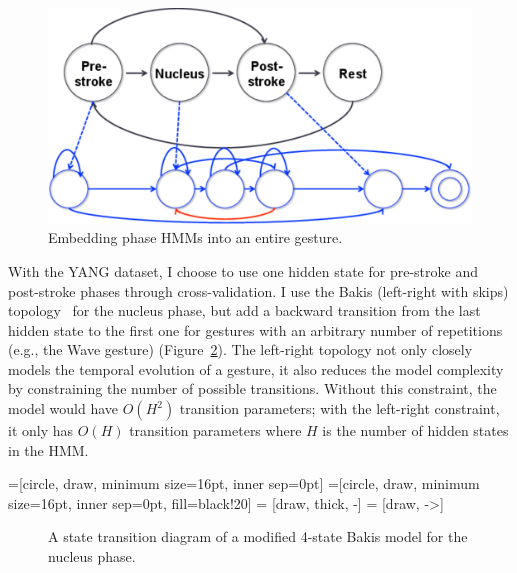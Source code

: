 \begin{figure}[tbh]
\centering
\includegraphics[width=0.7\columnwidth]{figures/embedded.pdf}
\caption{Embedding phase HMMs into an entire gesture.}
\label{fig:embed}
\end{figure}

With the YANG dataset, I choose to use one hidden state for pre-stroke and
post-stroke phases through cross-validation. I use the Bakis (left-right with
skips) topology~\cite{Bauer00} for the nucleus phase, but add a backward
transition from the last hidden state to the first one for gestures with an
arbitrary number of repetitions (e.g., the Wave gesture)
(Figure~\ref{fig:bakis}). The left-right topology not only closely models the temporal evolution of a gesture, it also reduces the model complexity
by constraining the number of possible transitions. Without this constraint,
the model would have $O(H^2)$ transition parameters; with the left-right
constraint, it only has $O(H)$ transition parameters where $H$ is the
number of hidden states in the HMM.

=[circle, draw, minimum size=16pt, inner sep=0pt]
=[circle, draw, minimum size=16pt, inner
sep=0pt, fill=black!20] 
 = [draw, thick, -]
 = [draw, ->]
\begin{figure}[tbh]
\centering
  \caption{A state transition diagram of a modified 4-state Bakis model for the nucleus phase.}
  \label{fig:bakis}
\end{figure}


